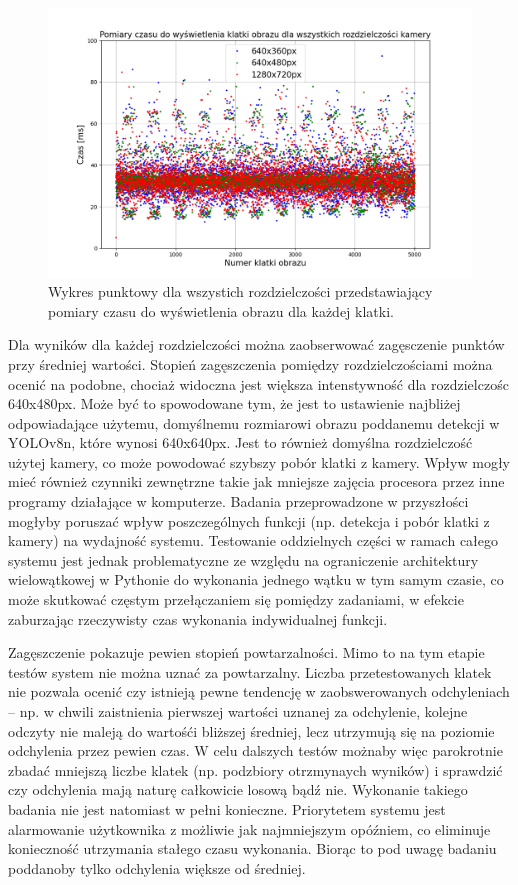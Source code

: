 \begin{figure}[H]
    \centering
    \includegraphics[width=\linewidth]{r_test_szybkosci/punkty/all.png}
    \caption{Wykres punktowy dla wszystich rozdzielczości przedstawiający pomiary czasu do wyświetlenia obrazu dla każdej klatki.}
    \label{fig:czas-punktowy-all}    
\end{figure}

Dla wyników dla każdej rozdzielczości można zaobserwować zagęsczenie punktów przy średniej wartości. 
Stopień zagęszczenia pomiędzy rozdzielczościami można ocenić na podobne, chociaż widoczna jest większa intenstywność dla rozdzielczośc 640x480px. Może być to spowodowane tym, że jest to ustawienie najbliżej odpowiadające użytemu, domyślnemu rozmiarowi obrazu poddanemu detekcji w YOLOv8n, które wynosi 640x640px. Jest to również domyślna rozdzielczość użytej kamery, co może powodować szybszy pobór klatki z kamery.
Wpływ mogły mieć również czynniki zewnętrzne takie jak mniejsze zajęcia procesora przez inne programy działające w komputerze. Badania przeprowadzone w przyszłości mogłyby poruszać wpływ poszczególnych funkcji (np. detekcja i pobór klatki z kamery) na wydajność systemu. 
Testowanie oddzielnych części w ramach całego systemu jest jednak problematyczne ze względu na ograniczenie architektury wielowątkowej w Pythonie do wykonania jednego wątku w tym samym czasie, co może skutkować częstym przełączaniem się pomiędzy zadaniami, w efekcie zaburzając rzeczywisty czas wykonania indywidualnej funkcji.  

Zagęszczenie pokazuje pewien stopień powtarzalności. Mimo to na tym etapie testów system nie można uznać za powtarzalny. Liczba przetestowanych klatek nie pozwala ocenić czy istnieją pewne tendencję w zaobswerowanych odchyleniach -- np. w chwili zaistnienia pierwszej wartości uznanej za odchylenie, kolejne odczyty nie maleją do wartośći bliższej średniej, lecz utrzymują się na poziomie odchylenia przez pewien czas. 
W celu dalszych testów możnaby więc parokrotnie zbadać mniejszą liczbe klatek (np. podzbiory otrzmynaych wyników) i sprawdzić czy odchylenia mają naturę całkowicie losową bądź nie. Wykonanie takiego badania nie jest natomiast w pełni konieczne. Priorytetem systemu jest alarmowanie użytkownika z możliwie jak najmniejszym opóźniem, co eliminuje konieczność utrzymania stałego czasu wykonania. Biorąc to pod uwagę badaniu poddanoby tylko odchylenia większe od średniej.


